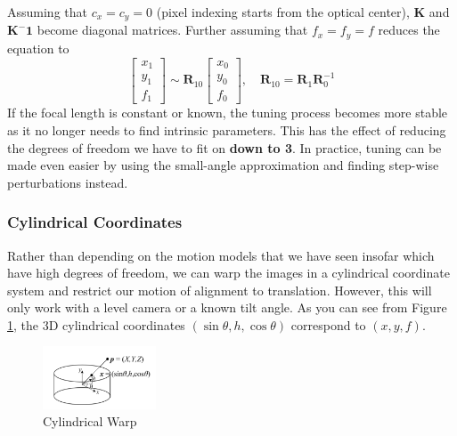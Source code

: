 \documentclass{article}
\let\vec\mathbf
\begin{document}
Assuming that $c_x=c_y=0$ (pixel indexing starts from the optical center), $\vec{K}$ and $\vec{K^-1}$ become diagonal matrices.
Further assuming that $f_x = f_y = f$ reduces the equation to
$$ 
\left[ \begin{array}{l}{x_{1}} \\ {y_{1}} \\ {f_{1}}\end{array}\right] \sim \boldsymbol{R}_{10} \left[ \begin{array}{l}{x_{0}} \\ {y_{0}} \\ {f_{0}}\end{array}\right],\quad
\boldsymbol{R}_{10} = \boldsymbol{R}_{1} \boldsymbol{R}_{0}^{-1}
$$
If the focal length is constant or known, the tuning process becomes more stable as it no longer needs to find intrinsic parameters.
This has the effect of reducing the degrees of freedom we have to fit on \textbf{down to 3}.
In practice, tuning can be made even easier by using the small-angle approximation and finding step-wise perturbations instead.

\subsubsection{Cylindrical Coordinates} 
Rather than depending on the motion models that we have seen insofar which have high degrees of freedom, we can warp the images in a cylindrical coordinate system and restrict our motion of alignment to translation. 
However, this will only work with a level camera or a known tilt angle. As you can see from Figure \ref{cylinder}, the 3D cylindrical coordinates $\left( \sin\theta, h, \cos\theta\right)$ correspond to $\left( x,y,f \right)$. \\
\begin{figure}
  \vspace{-45pt}
  \begin{center}
    \includegraphics[width=0.3\textwidth]{cylindrical.png}
  \end{center}
  \caption{Cylindrical Warp}
  \label{cylinder}
  \vspace{-35pt}
\end{figure}
\end{document}
